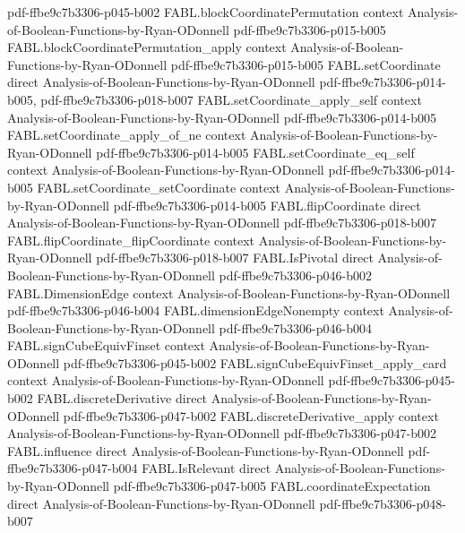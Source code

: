 \begin{theorem}
  {pdf-ffbe9c7b3306-p045-b002}
\proofstep
  {FABL.blockCoordinatePermutation}
  {context}
  {Analysis-of-Boolean-Functions-by-Ryan-ODonnell}
  {pdf-ffbe9c7b3306-p015-b005}
\proofstep
  {FABL.blockCoordinatePermutation_apply}
  {context}
  {Analysis-of-Boolean-Functions-by-Ryan-ODonnell}
  {pdf-ffbe9c7b3306-p015-b005}
\proofstep
  {FABL.setCoordinate}
  {direct}
  {Analysis-of-Boolean-Functions-by-Ryan-ODonnell}
  {pdf-ffbe9c7b3306-p014-b005,
    pdf-ffbe9c7b3306-p018-b007}
\proofstep
  {FABL.setCoordinate_apply_self}
  {context}
  {Analysis-of-Boolean-Functions-by-Ryan-ODonnell}
  {pdf-ffbe9c7b3306-p014-b005}
\proofstep
  {FABL.setCoordinate_apply_of_ne}
  {context}
  {Analysis-of-Boolean-Functions-by-Ryan-ODonnell}
  {pdf-ffbe9c7b3306-p014-b005}
\proofstep
  {FABL.setCoordinate_eq_self}
  {context}
  {Analysis-of-Boolean-Functions-by-Ryan-ODonnell}
  {pdf-ffbe9c7b3306-p014-b005}
\proofstep
  {FABL.setCoordinate_setCoordinate}
  {context}
  {Analysis-of-Boolean-Functions-by-Ryan-ODonnell}
  {pdf-ffbe9c7b3306-p014-b005}
\proofstep
  {FABL.flipCoordinate}
  {direct}
  {Analysis-of-Boolean-Functions-by-Ryan-ODonnell}
  {pdf-ffbe9c7b3306-p018-b007}
\proofstep
  {FABL.flipCoordinate_flipCoordinate}
  {context}
  {Analysis-of-Boolean-Functions-by-Ryan-ODonnell}
  {pdf-ffbe9c7b3306-p018-b007}
\proofstep
  {FABL.IsPivotal}
  {direct}
  {Analysis-of-Boolean-Functions-by-Ryan-ODonnell}
  {pdf-ffbe9c7b3306-p046-b002}
\proofstep
  {FABL.DimensionEdge}
  {context}
  {Analysis-of-Boolean-Functions-by-Ryan-ODonnell}
  {pdf-ffbe9c7b3306-p046-b004}
\proofstep
  {FABL.dimensionEdgeNonempty}
  {context}
  {Analysis-of-Boolean-Functions-by-Ryan-ODonnell}
  {pdf-ffbe9c7b3306-p046-b004}
\proofstep
  {FABL.signCubeEquivFinset}
  {context}
  {Analysis-of-Boolean-Functions-by-Ryan-ODonnell}
  {pdf-ffbe9c7b3306-p045-b002}
\proofstep
  {FABL.signCubeEquivFinset_apply_card}
  {context}
  {Analysis-of-Boolean-Functions-by-Ryan-ODonnell}
  {pdf-ffbe9c7b3306-p045-b002}
\proofstep
  {FABL.discreteDerivative}
  {direct}
  {Analysis-of-Boolean-Functions-by-Ryan-ODonnell}
  {pdf-ffbe9c7b3306-p047-b002}
\proofstep
  {FABL.discreteDerivative_apply}
  {context}
  {Analysis-of-Boolean-Functions-by-Ryan-ODonnell}
  {pdf-ffbe9c7b3306-p047-b002}
\proofstep
  {FABL.influence}
  {direct}
  {Analysis-of-Boolean-Functions-by-Ryan-ODonnell}
  {pdf-ffbe9c7b3306-p047-b004}
\proofstep
  {FABL.IsRelevant}
  {direct}
  {Analysis-of-Boolean-Functions-by-Ryan-ODonnell}
  {pdf-ffbe9c7b3306-p047-b005}
\proofstep
  {FABL.coordinateExpectation}
  {direct}
  {Analysis-of-Boolean-Functions-by-Ryan-ODonnell}
  {pdf-ffbe9c7b3306-p048-b007}

\end{theorem}

